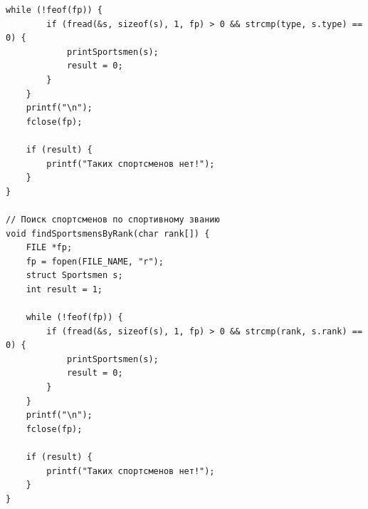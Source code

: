 \documentclass[12pt]{article}
\begin{document}
\begin{lstlisting}[label=repository.c, caption=repository.c]
    while (!feof(fp)) {
        if (fread(&s, sizeof(s), 1, fp) > 0 && strcmp(type, s.type) == 0) {
            printSportsmen(s);
            result = 0;
        }
    }
    printf("\n");
    fclose(fp);

    if (result) {
        printf("Таких спортсменов нет!");
    }
}

// Поиск спортсменов по спортивному званию
void findSportsmensByRank(char rank[]) {
    FILE *fp;
    fp = fopen(FILE_NAME, "r");
    struct Sportsmen s;
    int result = 1;

    while (!feof(fp)) {
        if (fread(&s, sizeof(s), 1, fp) > 0 && strcmp(rank, s.rank) == 0) {
            printSportsmen(s);
            result = 0;
        }
    }
    printf("\n");
    fclose(fp);

    if (result) {
        printf("Таких спортсменов нет!");
    }
}
\end{lstlisting} 

\newpage
\end{document}
